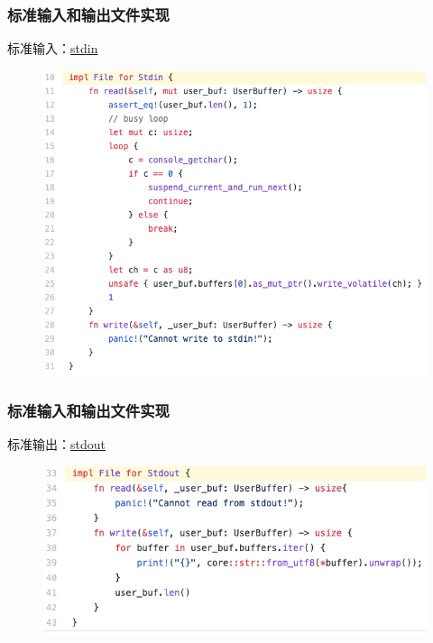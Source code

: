 \begin{frame}
	\frametitle{标准输入和输出文件实现}
% 
% 
标准输入：\href{https://github.com/rcore-os/rCore-Tutorial-v3/blob/ch6/os/src/fs/stdio.rs\#L10}{stdin}
    \begin{figure}
        \centering
        \includegraphics[width=0.6\linewidth]{figs/stdio-L10.png}
    \end{figure}
% 
% 
\end{frame}
\begin{frame}
	\frametitle{标准输入和输出文件实现}
标准输出：\href{https://github.com/rcore-os/rCore-Tutorial-v3/blob/ch6/os/src/fs/stdio.rs\#L33}{stdout}
    \begin{figure}
        \centering
        \includegraphics[width=0.6\linewidth]{figs/stdio-L33.png}
    \end{figure}
% 
% 
\end{frame}

